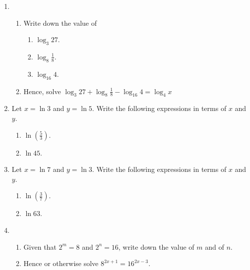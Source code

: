 \documentclass[12pt, oneside]{article}
\begin{document}
\begin{enumerate}
\item 
\begin{enumerate} \item Write down the value of
    \begin{enumerate}
    \item $\log_3 27$.
        \begin{flushright}[1]\end{flushright}
    \item $\log_8 \frac{1}{8}$.
        \begin{flushright}[1]\end{flushright}
    \item $\log_{16} 4$.
        \begin{flushright}[1]\end{flushright}
    \end{enumerate}
    \item Hence, solve $\log_3 27 + \log_8 \frac{1}{8} - \log_{16} 4 = \log_{4} x$
        \begin{flushright}[3]\end{flushright}
\end{enumerate}

\item Let $x=\ln 3$ and $y= \ln 5$. Write the following expressions in terms of $x$ and $y$.
\begin{enumerate}
    \item $\ln \left( \frac{5}{3} \right)$.
        \begin{flushright}[2]\end{flushright}
    \item $\ln 45$.
        \begin{flushright}[4]\end{flushright}
\end{enumerate}

\item Let $x=\ln 7$ and $y= \ln 3$. Write the following expressions in terms of $x$ and $y$.
\begin{enumerate}
    \item $\ln \left( \frac{3}{7} \right)$.
        \begin{flushright}[2]\end{flushright}
    \item $\ln 63$.
        \begin{flushright}[4]\end{flushright}
\end{enumerate}

\item 
\begin{enumerate}
    \item Given that $2^m=8$ and $2^n=16$, write down the value of $m$ and of $n$.
        \begin{flushright}[2]\end{flushright}
    \item Hence or otherwise solve $8^{2x+1}=16^{2x-3}$.
        \begin{flushright}[4]\end{flushright}
\end{enumerate}



\end{enumerate}
\end{document}
